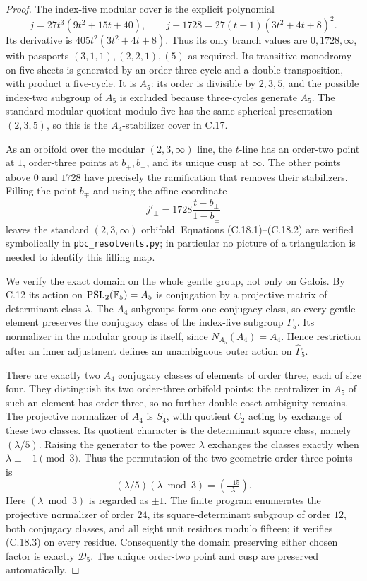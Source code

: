 \begin{proof}
The index-five modular cover is the explicit polynomial
\[
            j=27t^3(9t^2+15t+40),\qquad
 j-1728=27(t-1)(3t^2+4t+8)^2.
 \tag{C.18.1}
\]
Its derivative is $405t^2(3t^2+4t+8)$. Thus its only branch
values are $0,1728,\infty$, with passports
$(3,1,1),(2,2,1),(5)$ as required. Its transitive monodromy
on five sheets is generated by an order-three cycle and a
double transposition, with product a five-cycle. It is $A_5$:
its order is divisible by $2,3,5$, and the possible index-two
subgroup of $A_5$ is excluded because three-cycles generate
$A_5$. The standard modular quotient modulo five has the
same spherical presentation $(2,3,5)$, so this is the
$A_4$-stabilizer cover in C.17.

As an orbifold over the modular $(2,3,\infty)$ line, the
$t$-line has an order-two point at $1$, order-three points
at $b_+,b_-$, and its unique cusp at $\infty$. The other
points above $0$ and $1728$ have precisely the ramification
that removes their stabilizers. Filling the point $b_\mp$
and using the affine coordinate
\[
                  j'_\pm=1728\frac{t-b_\pm}{1-b_\pm}
 \tag{C.18.2}
\]
leaves the standard $(2,3,\infty)$ orbifold. Equations
(C.18.1)--(C.18.2) are verified symbolically in
\texttt{pbc\_resolvents.py}; in particular no picture of a
triangulation is needed to identify this filling map.

We verify the exact domain on the whole gentle group, not
only on Galois. By C.12 its action on
$\operatorname{PSL}_2(\mathbb F_5)=A_5$ is conjugation by a projective
matrix of determinant class $\lambda$. The $A_4$ subgroups
form one conjugacy class, so every gentle element preserves
the conjugacy class of the index-five subgroup $\Gamma_5$.
Its normalizer in the modular group is itself, since
$N_{A_5}(A_4)=A_4$. Hence restriction after an inner adjustment
defines an unambiguous outer action on $\widehat\Gamma_5$.

There are exactly two $A_4$ conjugacy classes of elements of
order three, each of size four. They distinguish its two
order-three orbifold points: the centralizer in $A_5$ of
such an element has order three, so no further double-coset
ambiguity remains. The projective normalizer of $A_4$ is
$S_4$, with quotient $C_2$ acting by exchange of these two
classes. Its quotient character is the determinant square
class, namely $(\lambda/5)$. Raising the generator to the
power $\lambda$ exchanges the classes exactly when
$\lambda\equiv-1\pmod3$. Thus the permutation of the two
geometric order-three points is
\[
                 (\lambda/5)(\lambda\bmod3)
                        =(\tfrac{-15}{\lambda}).
 \tag{C.18.3}
\]
Here $(\lambda\bmod3)$ is regarded as $\pm1$.
The finite program enumerates the projective normalizer of
order $24$, its square-determinant subgroup of order $12$,
both conjugacy classes, and all eight unit residues modulo
fifteen; it verifies (C.18.3) on every residue.
Consequently the domain preserving either chosen factor is
exactly $\mathcal D_5$. The unique order-two point and cusp
are preserved automatically.


\end{proof}
